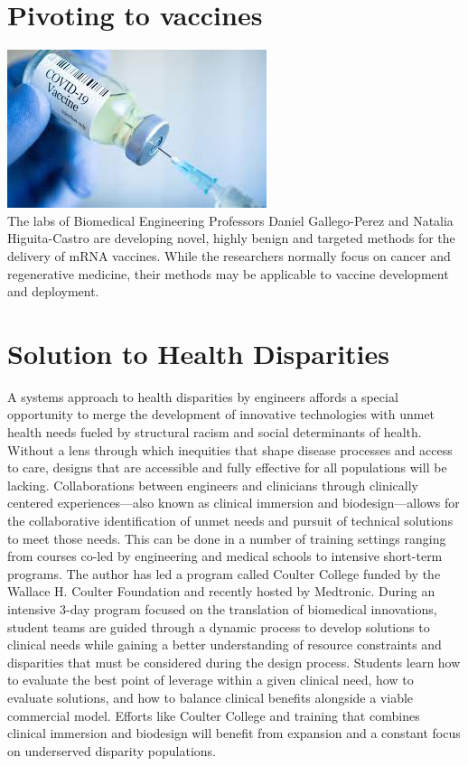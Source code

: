 \documentclass[12pt]{article}
\begin{document}
\section{Pivoting to vaccines}
\includegraphics[scale=0.6]{vac.jpeg}\\
The labs of Biomedical Engineering Professors Daniel Gallego-Perez and Natalia Higuita-Castro are developing novel, highly benign and targeted methods for the delivery of mRNA vaccines. While the researchers normally focus on cancer and regenerative medicine, their methods may be applicable to vaccine development and deployment.
\section{Solution to Health Disparities}
A systems approach to health disparities by engineers affords a special opportunity to merge the development of innovative technologies with unmet health needs fueled by structural racism and social determinants of health. Without a lens through which inequities that shape disease processes and access to care, designs that are accessible and fully effective for all populations will be lacking. Collaborations between engineers and clinicians through clinically centered experiences—also known as clinical immersion and biodesign—allows for the collaborative identification of unmet needs and pursuit of technical solutions to meet those needs. This can be done in a number of training settings ranging from courses co-led by engineering and medical schools to intensive short-term programs. The author has led a program called Coulter College funded by the Wallace H. Coulter Foundation and recently hosted by Medtronic. During an intensive 3-day program focused on the translation of biomedical innovations, student teams are guided through a dynamic process to develop solutions to clinical needs while gaining a better understanding of resource constraints and disparities that must be considered during the design process. Students learn how to evaluate the best point of leverage within a given clinical need, how to evaluate solutions, and how to balance clinical benefits alongside a viable commercial model. Efforts like Coulter College and training that combines clinical immersion and biodesign will benefit from expansion and a constant focus on underserved disparity populations.



\enddocument
\end{document}
